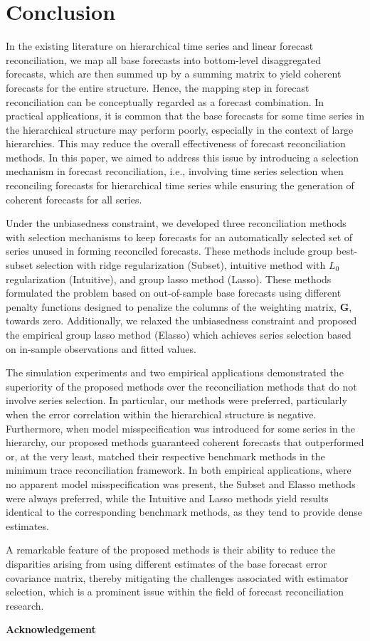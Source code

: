 \documentclass[11pt,a4paper,]{article}
\begin{document}
\hypertarget{sec-conclusion}{%
\section{Conclusion}\label{sec-conclusion}}

In the existing literature on hierarchical time series and linear
forecast reconciliation, we map all base forecasts into bottom-level
disaggregated forecasts, which are then summed up by a summing matrix to
yield coherent forecasts for the entire structure. Hence, the mapping
step in forecast reconciliation can be conceptually regarded as a
forecast combination. In practical applications, it is common that the
base forecasts for some time series in the hierarchical structure may
perform poorly, especially in the context of large hierarchies. This may
reduce the overall effectiveness of forecast reconciliation methods. In
this paper, we aimed to address this issue by introducing a selection
mechanism in forecast reconciliation, i.e., involving time series
selection when reconciling forecasts for hierarchical time series while
ensuring the generation of coherent forecasts for all series.

Under the unbiasedness constraint, we developed three reconciliation
methods with selection mechanisms to keep forecasts for an automatically
selected set of series unused in forming reconciled forecasts. These
methods include group best-subset selection with ridge regularization
(Subset), intuitive method with \(L_0\) regularization (Intuitive), and
group lasso method (Lasso). These methods formulated the problem based
on out-of-sample base forecasts using different penalty functions
designed to penalize the columns of the weighting matrix,
\(\boldsymbol{G}\), towards zero. Additionally, we relaxed the
unbiasedness constraint and proposed the empirical group lasso method
(Elasso) which achieves series selection based on in-sample observations
and fitted values.

The simulation experiments and two empirical applications demonstrated
the superiority of the proposed methods over the reconciliation methods
that do not involve series selection. In particular, our methods were
preferred, particularly when the error correlation within the
hierarchical structure is negative. Furthermore, when model
misspecification was introduced for some series in the hierarchy, our
proposed methods guaranteed coherent forecasts that outperformed or, at
the very least, matched their respective benchmark methods in the
minimum trace reconciliation framework. In both empirical applications,
where no apparent model misspecification was present, the Subset and
Elasso methods were always preferred, while the Intuitive and Lasso
methods yield results identical to the corresponding benchmark methods,
as they tend to provide dense estimates.

A remarkable feature of the proposed methods is their ability to reduce
the disparities arising from using different estimates of the base
forecast error covariance matrix, thereby mitigating the challenges
associated with estimator selection, which is a prominent issue within
the field of forecast reconciliation research.

\textbf{\large{Acknowledgement}}

\printbibliography
\end{document}
